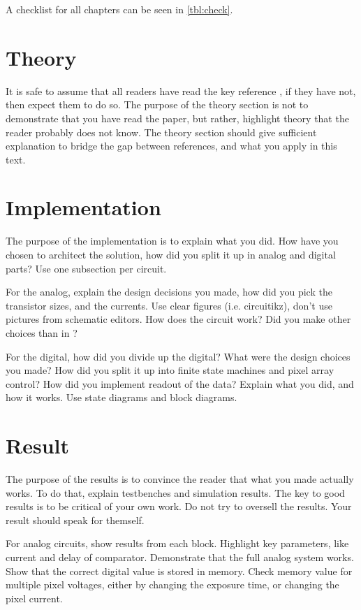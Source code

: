 \documentclass[paper,10pt,a4paper]{IEEEtran}
\begin{document}
A checklist for all chapters can be seen in \ref{tbl:check}.

\section{Theory}
It is safe to assume that all readers have read the key reference
\cite{klein01}, if they have not, then expect them to do so. The purpose of the
theory section is not to demonstrate that you have read the paper, but rather,
highlight theory that the reader probably does not know. The theory section
should give sufficient explanation to bridge the gap between references, and
what you apply in this text.

\section{Implementation}
The purpose of the implementation is to explain what you did. How have you
chosen to architect the solution, how did you split it up in analog and digital
parts? Use one subsection per circuit.

For the analog, explain the design decisions you made, how did you pick the transistor sizes,
and the currents. Use clear figures (i.e. circuitikz),
don't use pictures from schematic editors. How does the circuit work? Did you make other choices than in
\cite{klein01}?

For the digital, how did you divide up the digital? What were the design choices you made? How
did you split it up into finite state machines and pixel array control? How did
you implement readout of the data? Explain what you did, and how it works. Use
state diagrams and block diagrams.

\section{Result}
The purpose of the results is to convince the reader that what you made
actually works. To do that, explain testbenches and simulation results.
The key to good results is to be critical of your own work. Do not try to oversell
the results. Your result should speak for themself.

For analog circuits, show results from each block. Highlight key
parameters, like current and delay of comparator. Demonstrate that the full analog system works. Show that the correct
digital value is stored in memory. Check memory value for multiple pixel voltages, either by
changing the exposure time, or changing the pixel current.
\end{document}
